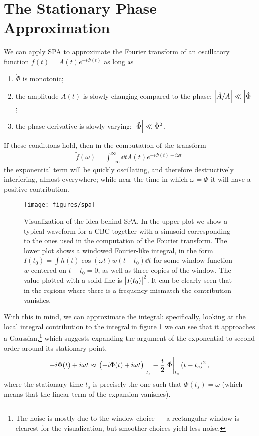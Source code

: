 \documentclass[main.tex]{subfiles}
\begin{document}
\appendix
\section{The Stationary Phase Approximation} \label{sec:spa}

We can apply \ac{SPA} to approximate the Fourier transform of an oscillatory function \(f(t) = A(t) e^{-i \Phi (t)}\) as long as \cite{chassande-mottinStationaryPhaseApproximation1998}
\begin{enumerate}
    \item \(\dot{\Phi}\) is monotonic;
    \item the amplitude \(A(t)\) is slowly changing compared to the phase: \(\abs{\dot{A} / A} \ll \abs{\dot{\Phi}}\);
    \item the phase derivative is slowly varying: \(\abs{\ddot{\Phi}} \ll \dot{\Phi}^2 \).
\end{enumerate}


If these conditions hold, then in the computation of the transform 
%
\begin{align}
\widetilde{f}(\omega ) = \int_{- \infty }^{\infty } \dd{t} A(t) e^{- i \Phi (t) + i \omega t}
\,
\end{align}
%
the exponential term will be quickly oscillating, and therefore destructively interfering, almost everywhere; while near the time in which  \(\omega = \dot{\Phi}\) it will have a positive contribution. 

\begin{figure}[ht]
\centering
\texttt{[image: figures/spa]}
\caption{Visualization of the idea behind \ac{SPA}. In the upper plot we show a typical waveform for a \ac{CBC} together with a sinusoid corresponding to the ones used in the computation of the Fourier transform. The lower plot shows a windowed Fourier-like integral, in the form \(I (t_0 ) = \int h(t) \cos(\omega t) w(t-t_0 ) \dd{t}\) for some window function \(w\) centered on \(t-t_0 = 0\), as well as three copies of the window. The value plotted with a solid line is \(\abs{I(t_0 )}^2\). It can be clearly seen that in the regions where there is a frequency mismatch the contribution vanishes.}
\label{fig:spa}
\end{figure}

With this in mind, we can approximate the integral: specifically, looking at the local integral contribution to the integral in figure \ref{fig:spa} we can see that it approaches a Gaussian,\footnote{The noise is mostly due to the window choice --- a rectangular window is clearest for the visualization, but smoother choices yield less noise.} which suggests expanding the argument of the exponential to second order around its stationary point, 
%
\begin{align}
- i \Phi (t) + i \omega t \approx \eval{\qty(-i \Phi (t) + i \omega t)}_{t_s} - \frac{i}{2} \eval{\ddot{\Phi}}_{t_s} (t-t_s)^2
\,,
\end{align}
%
where the stationary time \(t_s\) is precisely the one such that \(\dot{\Phi} (t_s) = \omega \) (which means that the linear term of the expansion vanishes). 
\end{document}
